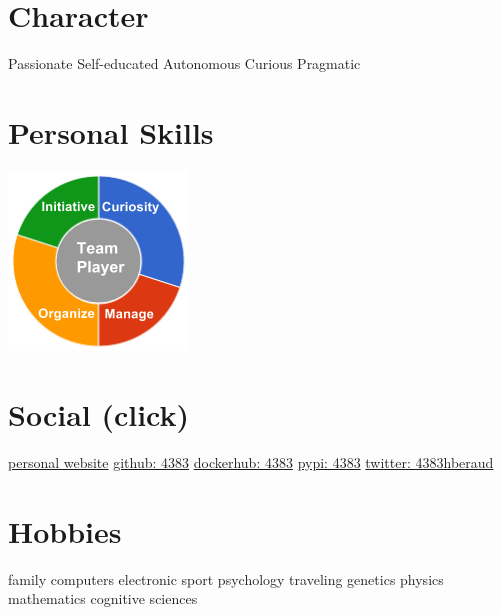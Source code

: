 \documentclass[]{friggeri-cv}
\begin{document}
\begin{aside}
~
~
~
    \section{Character}
        Passionate
        Self-educated
        Autonomous
        Curious
        Pragmatic
        ~
    \section{Personal Skills}
        \includegraphics[scale=0.62]{img/personal.png}
        ~
    \section{Social (click)}
        \href{http://herve.beraud.ovh/}{personal website}
        \href{https://github.com/4383}{github: 4383}
        \href{https://hub.docker.com/r/4383}{dockerhub: 4383}
        \href{https://warehouse.python.org/user/4383/}{pypi: 4383}
        \href{https://twitter.com/4383hberaud}{twitter: 4383hberaud}
        ~
    \section{Hobbies}
        family
        computers
        electronic
        sport
        psychology
        traveling
        genetics
        physics
        mathematics
        cognitive sciences
\end{aside}
\end{document}

